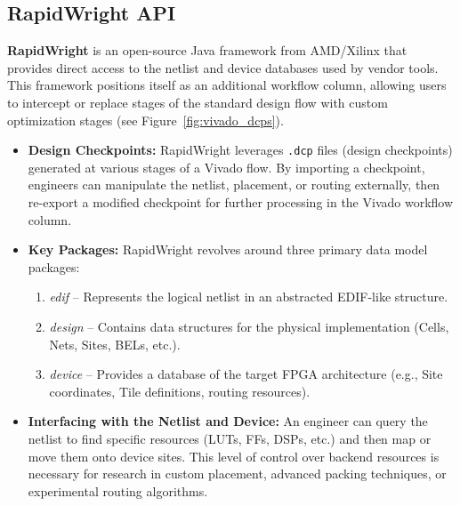 \documentclass{article}
\begin{document}
\begin{multicols}{2}
\section{RapidWright API}
    \label{sec:rapidwright_api}

    \textbf{RapidWright} is an open-source Java framework from AMD/Xilinx that provides direct access to the netlist and device databases used by vendor tools. 
    This framework positions itself as an additional workflow column, allowing users to intercept or replace stages of the standard design flow with custom optimization stages (see Figure~\ref{fig:vivado_dcps}).

    \begin{itemize}
    \item \textbf{Design Checkpoints:} 
        RapidWright leverages \texttt{.dcp} files (design checkpoints) generated at various stages of a Vivado flow. 
        By importing a checkpoint, engineers can manipulate the netlist, placement, or routing externally, then re-export a modified checkpoint for further processing in the Vivado workflow column.

    \item \textbf{Key Packages:} 
        RapidWright revolves around three primary data model packages:
        \begin{enumerate}
        \item \emph{edif} -- Represents the logical netlist in an abstracted EDIF-like structure.
        \item \emph{design} -- Contains data structures for the physical implementation (Cells, Nets, Sites, BELs, etc.).
        \item \emph{device} -- Provides a database of the target FPGA architecture (e.g., Site coordinates, Tile definitions, routing resources).
        \end{enumerate}

    \item \textbf{Interfacing with the Netlist and Device:} 
        An engineer can query the netlist to find specific resources (LUTs, FFs, DSPs, etc.) and then map or move them onto device sites. 
        This level of control over backend resources is necessary for research in custom placement, advanced packing techniques, or experimental routing algorithms.
    \end{itemize}


\end{multicols}
\end{document}
